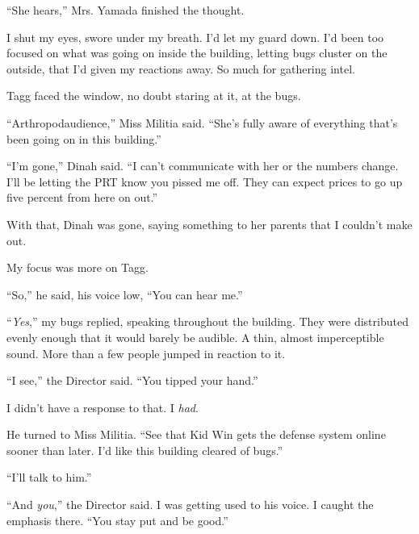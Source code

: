 ``She hears,'' Mrs. Yamada finished the thought.



I shut my eyes, swore under my breath.  I'd let my guard down.  I'd been too focused on what was going on inside the building, letting bugs cluster on the outside, that I'd given my reactions away.  So much for gathering intel.



Tagg faced the window, no doubt staring at it, at the bugs.



``Arthropodaudience,'' Miss Militia said.  ``She's fully aware of everything that's been going on in this building.''



``I'm gone,'' Dinah said.  ``I can't communicate with her or the numbers change.  I'll be letting the PRT know you pissed me off.  They can expect prices to go up five percent from here on out.''



With that, Dinah was gone, saying something to her parents that I couldn't make out.



My focus was more on Tagg.



``So,'' he said, his voice low, ``You can hear me.''



``\emph{Yes},'' my bugs replied, speaking throughout the building.  They were distributed evenly enough that it would barely be audible.  A thin, almost imperceptible sound.  More than a few people jumped in reaction to it.



``I see,'' the Director said.  ``You tipped your hand.''



I didn't have a response to that.  I \emph{had}.



He turned to Miss Militia.  ``See that Kid Win gets the defense system online sooner than later.  I'd like this building cleared of bugs.''



``I'll talk to him.''



``And \emph{you},'' the Director said.  I was getting used to his voice.  I caught the emphasis there.  ``You stay put and be good.''



